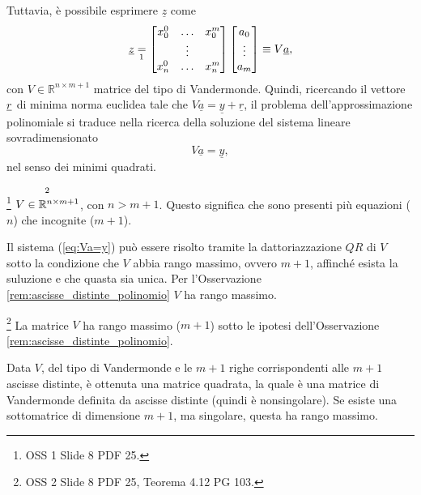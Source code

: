 Tuttavia, è possibile esprimere $\underline{z}$ come
\begin{equation*}
    \underline{z}\underset{\footnotemark}{=}
    \begin{bmatrix}
        x_0^0&\hdots &x_0^m\\
        &\vdots&\\
        x_n^0& \hdots &x_n^m
    \end{bmatrix}
    \begin{bmatrix}
        a_0\\
        \vdots\\
        a_m
    \end{bmatrix}
    \equiv V\underline{a},
\end{equation*}con $V\in \mathbb R^{n\times m+1}$ matrice del tipo di Vandermonde. Quindi, ricercando il vettore $\uline r$ di minima norma euclidea tale che $V\underline{a}=\underline{y}+\underline{r}$, il problema dell'approssimazione polinomiale si traduce nella ricerca della soluzione del sistema lineare sovradimensionato
\begin{equation}\label{eq:Va=y}
    V\underline{a}=\underline{y},
\end{equation}
nel senso dei minimi quadrati.

\begin{remark}
    \footnote{OSS 1 Slide 8 PDF 25.}
    $\overset{\footnotemark}{V\in\mathbb R^{n\times m+1}}$, con $n>m+1$. Questo significa che sono presenti più equazioni ($n$) che incognite ($m+1$).
\end{remark}

\begin{remark}
	Il sistema (\ref{eq:Va=y}) può essere risolto tramite la dattoriazzazione $QR$ di $V$ sotto la condizione che $V$ abbia rango massimo, ovvero $m+1$, affinché esista la suluzione e che quasta sia unica. Per l'Osservazione \ref{rem:ascisse_distinte_polinomio} $V$ ha rango massimo.
\end{remark}

\begin{remark}
    \footnote{OSS 2 Slide 8 PDF 25, Teorema 4.12 PG 103.}
    La matrice $V$ ha rango massimo ($m+1$) sotto le ipotesi dell'Osservazione \ref{rem:ascisse_distinte_polinomio}.
\end{remark}

Data $V$, del tipo di Vandermonde e le $m+1$ righe corrispondenti alle $m+1$ ascisse distinte, è ottenuta una matrice quadrata, la quale è una matrice di Vandermonde definita da ascisse distinte (quindi è nonsingolare). Se esiste una sottomatrice di dimensione $m+1$, ma singolare, questa ha rango massimo.

